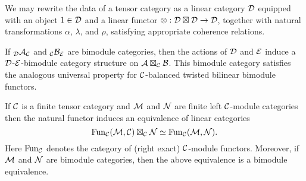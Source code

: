 \documentclass{amsart}
\begin{document}


\begin{remark} \label{rmk:rigidpreservedbytensor}
	We may rewrite the data  of a tensor category as a linear category $\mathcal D$ equipped with an object $1 \in \mathcal D$ and a linear functor $\otimes: \mathcal D \boxtimes \mathcal D \to \mathcal D $, together with natural transformations $\alpha$, $\lambda$, and $\rho$, satisfying appropriate coherence relations. %
\end{remark}

\begin{remark}
	If ${}_{\mathcal D}\mathcal A_{\mathcal C}$ and ${}_{\mathcal C}\mathcal B_{\mathcal E}$ are bimodule categories, then the actions of $\mathcal D$ and $\mathcal E$ induce a $\mathcal D$-$\mathcal E$-bimodule category structure on $\mathcal A \boxtimes_{\mathcal C} \mathcal B$. This bimodule category satisfies the analogous universal property for $\mathcal C$-balanced twisted bilinear bimodule functors. 
\end{remark}

\begin{lemma} \label{Lma:FunctorsAsATensorPdt}
	If $\mathcal C$ is a finite tensor category and $\mathcal M$ and $\mathcal N$ are finite left $\mathcal C$-module categories then the natural functor induces an equivalence of linear categories
	\begin{equation*}
		\operatorname{Fun}_\mathcal C(\mathcal M, \mathcal C) \boxtimes_\mathcal C \mathcal N \simeq \operatorname{Fun}_\mathcal C(\mathcal M,\mathcal N).
	\end{equation*} 
	Here $\operatorname{Fun}_\mathcal C$ denotes the category of (right exact) $\mathcal C$-module functors. 
	Moreover, if $\mathcal M$ and $\mathcal N$ are bimodule categories, then the above equivalence is a bimodule equivalence. 
\end{lemma}
\end{document}
